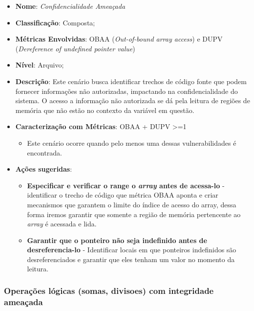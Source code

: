 \begin{itemize}
\item \textbf{Nome}: \emph{Confidencialidade Ameaçada}
\item \textbf{Classificação}: Composta;
\item \textbf{Métricas Envolvidas}: OBAA (\emph{Out-of-bound array access}) e DUPV (\emph{Dereference of undefined pointer value}) 
\item \textbf{Nível}: Arquivo;
\item \textbf{Descrição}: Este cenário busca identificar trechos de código fonte que podem fornecer informações não autorizadas, impactando na confidencialidade do sistema. O acesso a informação não autorizada se dá pela leitura de regiões de memória que não estão no contexto da variável em questão.
\item \textbf{Caracterização com Métricas}: OBAA + DUPV >=1
	\begin{itemize}
	\item Este cenário ocorre quando pelo menos uma dessas vulnerabilidades é encontrada.
	\end{itemize}
\item \textbf{Ações sugeridas}: 
	\begin{itemize}
	\item \textbf{Especificar e verificar o range o \emph{array} antes de acessa-lo} - identificar o trecho de código que métrica OBAA aponta e criar mecanismos que garantem o limite do índice de acesso do array, dessa forma iremos garantir que somente a região de memória pertencente ao \emph{array} é acessada e lida.  
	\item \textbf{Garantir que o ponteiro não seja indefinido antes de desreferencia-lo} - Identificar locais em que ponteiros indefinidos são desreferenciados e garantir que eles tenham um valor no momento da leitura.  
	 
	\end{itemize}
\end{itemize}



%
%
%



\subsubsection{Operações lógicas (somas, divisoes) com integridade ameaçada}

